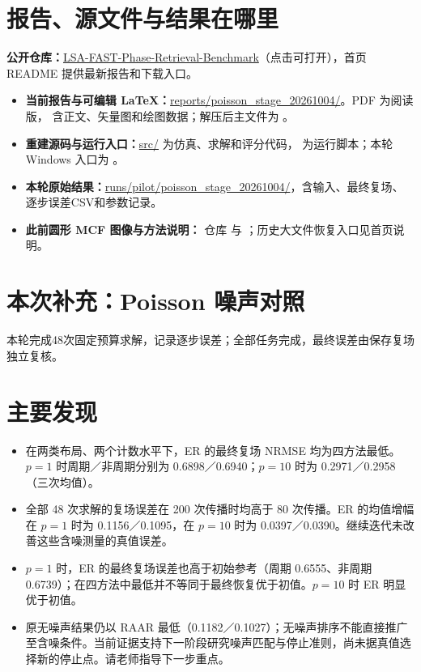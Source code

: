 \documentclass[UTF8,a4paper,11pt,fontset=fandol]{ctexart}
\begin{document}
\section*{报告、源文件与结果在哪里}
\textbf{公开仓库：}\href{https://github.com/BoVVENGibNieAuf/LSA-FAST-Phase-Retrieval-Benchmark}{LSA-FAST-Phase-Retrieval-Benchmark}（点击可打开），首页 README 提供最新报告和下载入口。
\begin{itemize}
\item \textbf{当前报告与可编辑 LaTeX：}\href{https://github.com/BoVVENGibNieAuf/LSA-FAST-Phase-Retrieval-Benchmark/tree/main/reports/poisson_stage_20261004}{reports/poisson\_stage\_20261004/}。PDF 为阅读版， 含正文、矢量图和绘图数据；解压后主文件为 。
\item \textbf{重建源码与运行入口：}\href{https://github.com/BoVVENGibNieAuf/LSA-FAST-Phase-Retrieval-Benchmark/tree/main/src}{src/} 为仿真、求解和评分代码， 为运行脚本；本轮 Windows 入口为 。
\item \textbf{本轮原始结果：}\href{https://github.com/BoVVENGibNieAuf/LSA-FAST-Phase-Retrieval-Benchmark/tree/main/runs/pilot/poisson_stage_20261004}{runs/pilot/poisson\_stage\_20261004/}，含输入、最终复场、逐步误差CSV和参数记录。
\item \textbf{此前圆形 MCF 图像与方法说明：} 仓库  与 ；历史大文件恢复入口见首页说明。
\end{itemize}
\clearpage
\section*{本次补充：Poisson 噪声对照}
本轮完成48次固定预算求解，记录逐步误差；全部任务完成，最终误差由保存复场独立复核。
\section*{主要发现}
\begin{itemize}
\item 在两类布局、两个计数水平下，ER 的最终复场 NRMSE 均为四方法最低。$p=1$ 时周期／非周期分别为 0.6898／0.6940；$p=10$ 时为 0.2971／0.2958（三次均值）。
\item 全部 48 次求解的复场误差在 200 次传播时均高于 80 次传播。ER 的均值增幅在 $p=1$ 时为 0.1156／0.1095，在 $p=10$ 时为 0.0397／0.0390。继续迭代未改善这些含噪测量的真值误差。
\item $p=1$ 时，ER 的最终复场误差也高于初始参考（周期 0.6555、非周期 0.6739）；在四方法中最低并不等同于最终恢复优于初值。$p=10$ 时 ER 明显优于初值。
\item 原无噪声结果仍以 RAAR 最低（0.1182／0.1027）；无噪声排序不能直接推广至含噪条件。当前证据支持下一阶段研究噪声匹配与停止准则，尚未据真值选择新的停止点。请老师指导下一步重点。
\end{itemize}
\end{document}
